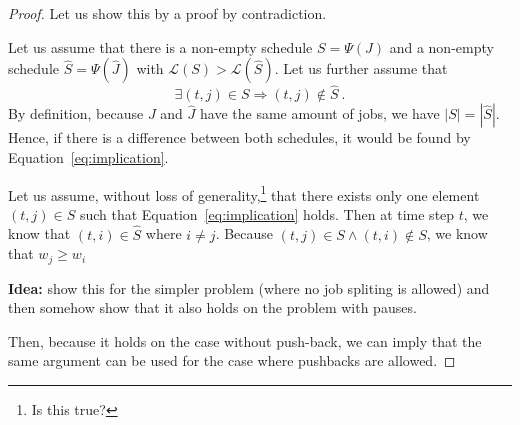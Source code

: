 \begin{proof}


    

    Let us show this by a proof by contradiction. 

    Let us assume that there is a non-empty schedule $S = \Psi(J)$ and a non-empty schedule $\hat{S} = \Psi (\hat{J})$ with $\mathcal{L}(S) > \mathcal{L}(\hat{S})$. 
    Let us further assume that 
    \begin{equation}
        \exists (t, j) \in S \Rightarrow (t, j)\notin \hat{S} \ .
        \label{eq:implication}
    \end{equation} 
    By definition, because $J$ and $\hat{J}$ have the same amount of jobs, we have $|S| = |\hat{S}|$. 
    Hence, if there is a difference between both schedules, it would be found by Equation~\ref{eq:implication}.

    Let us assume, without loss of generality,\!\footnote{Is this true?} that there exists only one element $(t, j)\in S$ such that Equation~\ref{eq:implication} holds.
    Then at time step $t$, we know that $(t, i)\in \hat{S}$ where $i\neq j$. Because $(t, j)\in S \land (t, i)\notin S$, we know that $w_j \geq w_i$


    \textbf{Idea:} show this for the simpler problem (where no job spliting is allowed) and then somehow show that it also holds on the problem with pauses. 

    Then, because it holds on the case without push-back, we can imply that the same argument can be used for the case where pushbacks are allowed.

\end{proof}

